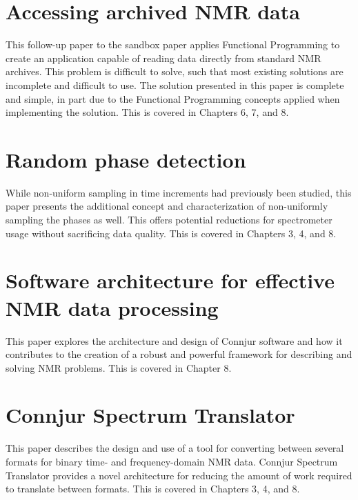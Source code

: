 \section{Accessing archived NMR data}
This follow-up paper to the sandbox paper applies Functional Programming
to create \cite{fenwick2013} an application capable of reading data directly
from standard NMR archives.  This problem is difficult to solve, such
that most existing solutions are incomplete and difficult to use.  The solution
presented in this paper is complete and simple, in part due to the 
Functional Programming concepts applied when implementing the solution.
This is covered in Chapters 6, 7, and 8.


\section{Random phase detection}
While non-uniform sampling in time increments had previously been studied,
this paper \cite{maciejewski2011random} presents the additional concept and
characterization of non-uniformly sampling the phases as well.  This offers
potential reductions for spectrometer usage without sacrificing data quality.
This is covered in Chapters 3, 4, and 8.


\section{Software architecture for effective NMR data processing}
This paper \cite{connjur_pipeline} explores the architecture and design of 
Connjur software and how it contributes to the creation of a robust and
powerful framework for describing and solving NMR problems.
This is covered in Chapter 8.


\section{Connjur Spectrum Translator}
This paper \cite{connjur-st} describes the design and use of a tool for 
converting between several formats for binary time- and frequency-domain
NMR data.  Connjur Spectrum Translator provides a novel architecture for 
reducing the amount of work required to translate between formats.  This is
covered in Chapters 3, 4, and 8.

